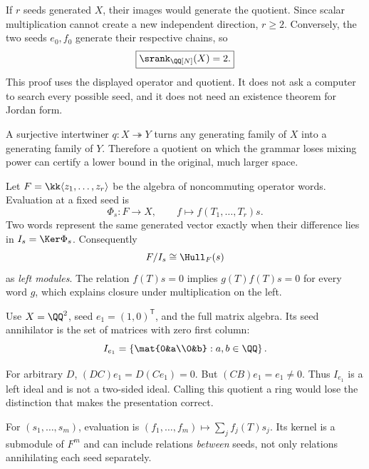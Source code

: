 If $r$ seeds generated $X$, their images would generate the quotient. Since scalar multiplication cannot create a new independent direction, $r\ge2$. Conversely, the two seeds $e_0,f_0$ generate their respective chains, so
\[
\boxed{\srank_{\QQ[N]}(X)=2.}
\]
This proof uses the displayed operator and quotient. It does not ask a computer to search every possible seed, and it does not need an existence theorem for Jordan form.

A surjective intertwiner $q:X\twoheadrightarrow Y$ turns any generating family of $X$ into a generating family of $Y$. Therefore a quotient on which the grammar loses mixing power can certify a lower bound in the original, much larger space.


Let $F=\kk\langle z_1,\ldots,z_r\rangle$ be the algebra of noncommuting operator words. Evaluation at a fixed seed is
\[
\Phi_s:F\to X,\qquad f\mapsto f(T_1,\ldots,T_r)s.
\]
Two words represent the same generated vector exactly when their difference lies in $I_s=\Ker\Phi_s$. Consequently
\[
F/I_s\cong\Hull_F(s)
\]
as \emph{left modules}. The relation $f(T)s=0$ implies $g(T)f(T)s=0$ for every word $g$, which explains closure under multiplication on the left.

Use $X=\QQ^2$, seed $e_1=(1,0)^\mathsf T$, and the full matrix algebra. Its seed annihilator is the set of matrices with zero first column:
\[
I_{e_1}=\left\{\mat{0&a\\0&b}:a,b\in\QQ\right\}.
\]


For arbitrary $D$, $(DC)e_1=D(Ce_1)=0$. But $(CB)e_1=e_1\ne0$. Thus $I_{e_1}$ is a left ideal and is not a two-sided ideal. Calling this quotient a ring would lose the distinction that makes the presentation correct.

For $(s_1,\ldots,s_m)$, evaluation is $(f_1,\ldots,f_m)\mapsto\sum_j f_j(T)s_j$. Its kernel is a submodule of $F^m$ and can include relations \emph{between} seeds, not only relations annihilating each seed separately.

